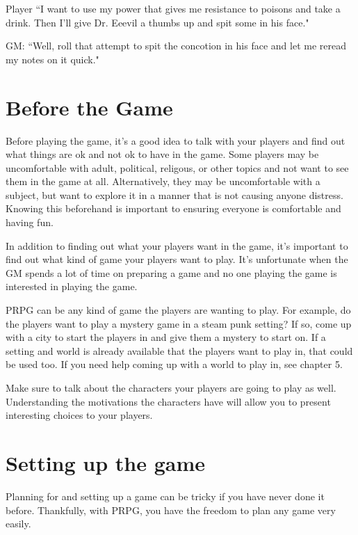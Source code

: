 \begin{flushleft}
Player ``I want to use my power that gives me resistance to poisons and take a
drink. Then I'll give Dr. Eeevil a thumbs up and spit some in his face."

GM: ``Well, roll that attempt to spit the concotion in his face and let me
reread my notes on it quick."

\section*{Before the Game}

Before playing the game, it's a good idea to talk with your players and find out
what things are ok and not ok to have in the game. Some players may be
uncomfortable with adult, political, religous, or other topics and not want to
see them in the game at all. Alternatively, they may be uncomfortable with a
subject, but want to explore it in a manner that is not causing anyone
distress. Knowing this beforehand is important to ensuring everyone is
comfortable and having fun.

In addition to finding out what your players want in the game, it's important
to find out what kind of game your players want to play. It's unfortunate when
the GM spends a lot of time on preparing a game and no one playing the game
is interested in playing the game.

PRPG can be any kind of game the players are wanting to play. For example, do
the players want to play a mystery game in a steam punk setting? If so, come up
with a city to start the players in and give them a mystery to start on.
If a setting and world is already available that the players want to play in,
that could be used too. If you need help coming up with a world to play in,
see chapter 5.

Make sure to talk about the characters your players are going to play as well.
Understanding the motivations the characters have will allow you to present
interesting choices to your players.

\section*{Setting up the game}

Planning for and setting up a game can be tricky if you have never done it
before. Thankfully, with PRPG, you have the freedom to plan any game very
easily.


\end{flushleft}
